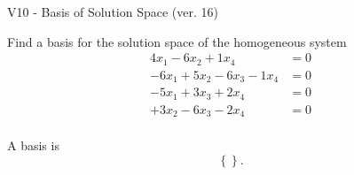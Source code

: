 \begin{exercise}
  \begin{exerciseTitle}V10 - Basis of Solution Space (ver. 16)\end{exerciseTitle}
  \begin{exerciseStatement}
    Find a basis for the solution space of the homogeneous system 
\begin{align*}
 4 x_ 1 -6 x_ 2 + 1 x_ 4 &= 0  \\ 
  -6 x_ 1 + 5 x_ 2 -6 x_ 3 -1 x_ 4 &= 0  \\ 
  -5 x_ 1 + 3 x_ 3 + 2 x_ 4 &= 0  \\ 
  + 3 x_ 2 -6 x_ 3 -2 x_ 4 &= 0  \\ 
 \end{align*}


 
  \end{exerciseStatement}

  \begin{exerciseAnswer}
   A basis is   
\[\left\{\right\}.\]

  


  \end{exerciseAnswer}
\end{exercise}